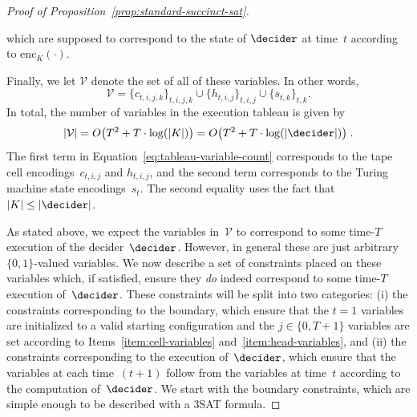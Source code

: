 \begin{proof}[Proof of Proposition~\ref{prop:standard-succinct-sat}]
\begin{enumerate}
\begin{equation*}
    \end{equation*}
    which are supposed to correspond to the state of $\decider$ at time~$t$
    according to $\mathrm{enc}_K(\cdot)$.
  \end{enumerate}
  Finally, we let $\mathcal{V}$ denote the set of all of these variables.
  In other words,
  \begin{equation*}
    \mathcal{V} = \{c_{t, i, j, k}\}_{t, i, j, k} \cup \{h_{t, i, j}\}_{t, i, j}
    \cup \{s_{t, k}\}_{t, k}.
  \end{equation*}
  In total, the number of variables in the execution tableau is given by
  \begin{equation}\label{eq:tableau-variable-count}
    |\mathcal{V}|
    = O\big(T^2 + T \cdot \log(|K|)\big)
    = O\big(T^2 + T \cdot \log(|\decider|)\big)\;.
  \end{equation}
  The first term in Equation~\eqref{eq:tableau-variable-count}
  corresponds to the tape cell encodings~$c_{t, i, j}$ and $h_{t, i, j}$,
  and the second term corresponds to the Turing machine state encodings~$s_t$.
  The second equality uses the fact that $|K| \leq |\decider|$.

  As stated above, we expect the variables in~$\mathcal{V}$ to correspond to
  some time-$T$ execution of the decider~$\decider$.
  However, in general these are just arbitrary $\{0, 1\}$-valued variables.
  We now describe a set of constraints placed on these variables which, if
  satisfied, ensure they \emph{do} indeed correspond to some time-$T$ execution
  of~$\decider$.
  These constraints will be split into two categories: (i) the constraints
  corresponding to the boundary, which ensure that the $t=1$ variables are
  initialized to a valid starting configuration and the $j \in \{0, T+1\}$
  variables are set according to Items~\ref{item:cell-variables}
  and~\ref{item:head-variables}, and (ii) the constraints corresponding to the
  execution of~$\decider$, which ensure that the variables at each time~$(t+1)$
  follow from the variables at time~$t$ according to the computation
  of~$\decider$.
  We start with the boundary constraints, which are simple enough to be
  described with a 3SAT formula.


\end{proof}
